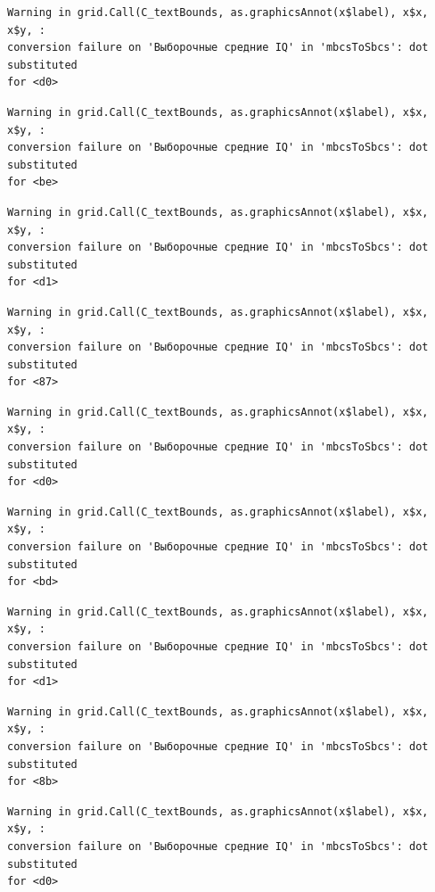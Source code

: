 \documentclass[
  letterpaper,
  DIV=11,
  numbers=noendperiod]{scrreprt}
\theoremstyle{definition}
\theoremstyle{remark}
\begin{document}
\begin{verbatim}
Warning in grid.Call(C_textBounds, as.graphicsAnnot(x$label), x$x, x$y, :
conversion failure on 'Выборочные средние IQ' in 'mbcsToSbcs': dot substituted
for <d0>
\end{verbatim}

\begin{verbatim}
Warning in grid.Call(C_textBounds, as.graphicsAnnot(x$label), x$x, x$y, :
conversion failure on 'Выборочные средние IQ' in 'mbcsToSbcs': dot substituted
for <be>
\end{verbatim}

\begin{verbatim}
Warning in grid.Call(C_textBounds, as.graphicsAnnot(x$label), x$x, x$y, :
conversion failure on 'Выборочные средние IQ' in 'mbcsToSbcs': dot substituted
for <d1>
\end{verbatim}

\begin{verbatim}
Warning in grid.Call(C_textBounds, as.graphicsAnnot(x$label), x$x, x$y, :
conversion failure on 'Выборочные средние IQ' in 'mbcsToSbcs': dot substituted
for <87>
\end{verbatim}

\begin{verbatim}
Warning in grid.Call(C_textBounds, as.graphicsAnnot(x$label), x$x, x$y, :
conversion failure on 'Выборочные средние IQ' in 'mbcsToSbcs': dot substituted
for <d0>
\end{verbatim}

\begin{verbatim}
Warning in grid.Call(C_textBounds, as.graphicsAnnot(x$label), x$x, x$y, :
conversion failure on 'Выборочные средние IQ' in 'mbcsToSbcs': dot substituted
for <bd>
\end{verbatim}

\begin{verbatim}
Warning in grid.Call(C_textBounds, as.graphicsAnnot(x$label), x$x, x$y, :
conversion failure on 'Выборочные средние IQ' in 'mbcsToSbcs': dot substituted
for <d1>
\end{verbatim}

\begin{verbatim}
Warning in grid.Call(C_textBounds, as.graphicsAnnot(x$label), x$x, x$y, :
conversion failure on 'Выборочные средние IQ' in 'mbcsToSbcs': dot substituted
for <8b>
\end{verbatim}

\begin{verbatim}
Warning in grid.Call(C_textBounds, as.graphicsAnnot(x$label), x$x, x$y, :
conversion failure on 'Выборочные средние IQ' in 'mbcsToSbcs': dot substituted
for <d0>
\end{verbatim}
\end{document}
